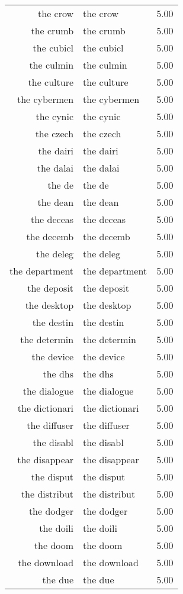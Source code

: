 \begin{table}[ht]
\begin{tabular}{rlr}
  the crow & the crow & 5.00 \\ 
  the crumb & the crumb & 5.00 \\ 
  the cubicl & the cubicl & 5.00 \\ 
  the culmin & the culmin & 5.00 \\ 
  the culture & the culture & 5.00 \\ 
  the cybermen & the cybermen & 5.00 \\ 
  the cynic & the cynic & 5.00 \\ 
  the czech & the czech & 5.00 \\ 
  the dairi & the dairi & 5.00 \\ 
  the dalai & the dalai & 5.00 \\ 
  the de & the de & 5.00 \\ 
  the dean & the dean & 5.00 \\ 
  the deceas & the deceas & 5.00 \\ 
  the decemb & the decemb & 5.00 \\ 
  the deleg & the deleg & 5.00 \\ 
  the department & the department & 5.00 \\ 
  the deposit & the deposit & 5.00 \\ 
  the desktop & the desktop & 5.00 \\ 
  the destin & the destin & 5.00 \\ 
  the determin & the determin & 5.00 \\ 
  the device & the device & 5.00 \\ 
  the dhs & the dhs & 5.00 \\ 
  the dialogue & the dialogue & 5.00 \\ 
  the dictionari & the dictionari & 5.00 \\ 
  the diffuser & the diffuser & 5.00 \\ 
  the disabl & the disabl & 5.00 \\ 
  the disappear & the disappear & 5.00 \\ 
  the disput & the disput & 5.00 \\ 
  the distribut & the distribut & 5.00 \\ 
  the dodger & the dodger & 5.00 \\ 
  the doili & the doili & 5.00 \\ 
  the doom & the doom & 5.00 \\ 
  the download & the download & 5.00 \\ 
  the due & the due & 5.00 \\ 

\end{tabular}
\end{table}

